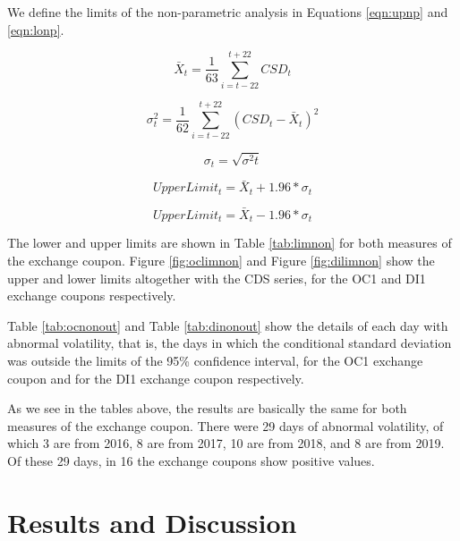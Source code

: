 \documentclass[cic,tc, english]{iiufrgs}
\begin{document}
    We define the limits of the non-parametric analysis in Equations \ref{eqn:upnp} and \ref{eqn:lonp}.

    $$\bar{X}_t = \frac{1}{63} \displaystyle\sum_{i=t-22}^{t+22} CSD_t$$

    $$\sigma^2_t = \frac{1}{62} \displaystyle\sum_{i=t-22}^{t+22} (CSD_t - \bar{X}_t)^2$$

    $$\sigma_t = \sqrt{\sigma^2t}$$

    \begin{equation}
        \label{eqn:upnp}
        UpperLimit_t = \bar{X}_t + 1.96 * \sigma_t
    \end{equation}

    \begin{equation}
        \label{eqn:lonp}
        UpperLimit_t = \bar{X}_t - 1.96 * \sigma_t
    \end{equation}

    The lower and upper limits are shown in Table \ref{tab:limnon} for both measures of the exchange coupon. Figure \ref{fig:oclimnon} and Figure \ref{fig:dilimnon} show the upper and lower limits altogether with the CDS series, for the OC1 and DI1 exchange coupons respectively.

    

    

    

    Table \ref{tab:ocnonout} and Table \ref{tab:dinonout} show the details of each day with abnormal volatility, that is, the days in which the conditional standard deviation was outside the limits of the 95\% confidence interval, for the OC1 exchange coupon and for the DI1 exchange coupon respectively.

    

    

    As we see in the tables above, the results are basically the same for both measures of the exchange coupon. There were 29 days of abnormal volatility, of which 3 are from 2016, 8 are from 2017, 10 are from 2018, and 8 are from 2019. Of these 29 days, in 16 the exchange coupons show positive values.

\chapter{Results and Discussion} \label{chapter_results_discussion}
\end{document}
